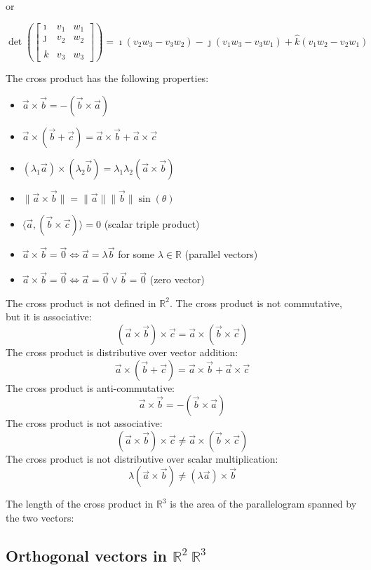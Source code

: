 or 

\[
\det\left( \begin{bmatrix}
	\imath & v_1 & w_1 \\
	\jmath & v_2 & w_2 \\
	\hat{k} & v_3 & w_3
\end{bmatrix} \right)
= \imath (v_2 w_3 - v_3 w_2) - \jmath (v_1 w_3 - v_3 w_1) + \hat{k}(v_1 w_2 - v_2 w_1)
\]


 The cross product has the following properties:
\begin{itemize}[label=\(-\)]
	\item \(\vec{a} \times \vec{b} = -(\vec{b} \times \vec{a})\)
	\item \(\vec{a} \times (\vec{b} + \vec{c}) = \vec{a} \times \vec{b} + \vec{a} \times \vec{c}\)
	\item \((\lambda_1\vec{a}) \times (\lambda_2\vec{b}) = \lambda_1\lambda_2(\vec{a} \times \vec{b})\)
	\item \(\|\vec{a} \times \vec{b}\| = \|\vec{a}\|\|\vec{b}\| \sin(\theta)\)
	\item \(\langle\vec{a}, (\vec{b} \times \vec{c})\rangle = 0\) (scalar triple product)
	\item \(\vec{a} \times \vec{b} = \vec{0} \Leftrightarrow \vec{a} = \lambda\vec{b}\) for some \(\lambda \in \mathbb{R}\) (parallel vectors)
	\item \(\vec{a} \times \vec{b} = \vec{0} \Leftrightarrow \vec{a} = \vec{0} \vee \vec{b} = \vec{0}\) (zero vector)
\end{itemize}
 The cross product is not defined in \(\mathbb{R}^2\).
 The cross product is not commutative, but it is associative:
\[
	(\vec{a} \times \vec{b}) \times \vec{c} = \vec{a} \times (\vec{b} \times \vec{c})
\]
 The cross product is distributive over vector addition:
\[
	\vec{a} \times (\vec{b} + \vec{c}) = \vec{a} \times \vec{b} + \vec{a} \times \vec{c}
\]
 The cross product is anti-commutative:
\[
	\vec{a} \times \vec{b} = -(\vec{b} \times \vec{a})
\]
 The cross product is not associative:
\[
	(\vec{a} \times \vec{b}) \times \vec{c} \neq \vec{a} \times (\vec{b} \times \vec{c})
\]
 The cross product is not distributive over scalar multiplication:
\[
	\lambda(\vec{a} \times \vec{b}) \neq (\lambda\vec{a}) \times \vec{b}
\]

 The length of the cross product in \(\mathbb{R}^3\) is the area of the parallelogram spanned by the two vectors:

\subsection{Orthogonal vectors in \texorpdfstring{\(\mathbb{R}^2\ \mathbb{R}^3\)}{}}

